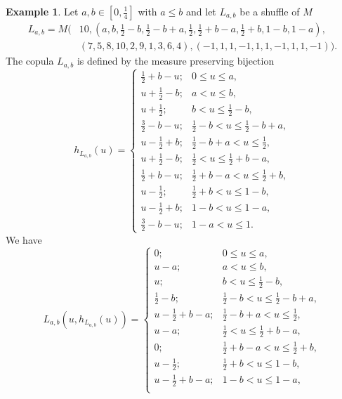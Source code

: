 \documentclass[12pt,a4paper]{amsart}
\theoremstyle{definition}
\newtheorem{example}[theorem]{Example}
\begin{document}
\begin{example}\label{ex:F5}
Let $a, b \in [0, \tfrac14]$ with $a \le b$ and let $L_{a,b}$ be a shuffle of $M$
\begin{align*}
    L_{a,b} = M\big(&10, (a, b, \tfrac12 - b, \tfrac12 - b + a, \tfrac12, \tfrac12 + b - a, \tfrac12 + b, 1-b, 1-a), \\
    &(7,5,8,10,2,9,1,3,6,4), (-1, 1, 1, -1, 1, 1, -1, 1, 1, -1)\big).
\end{align*}
The copula $L_{a,b}$ is defined by the measure preserving bijection 
$$ h_{L_{a,b}}(u) =  \begin{cases}
            \tfrac12 + b - u; &  0 \le u \le a, \\
            u + \tfrac12 - b; &  a < u \le b, \\
            u + \tfrac12; &  b < u \le \tfrac12 - b, \\
            \tfrac32 - b - u; &  \tfrac12 - b < u \le \tfrac12 - b + a, \\
            u - \tfrac12 + b; &  \tfrac12 - b + a < u \le \tfrac12, \\
            u + \tfrac12 - b; &  \tfrac12 < u \le \tfrac12 + b - a, \\
            \tfrac12 + b - u; &  \tfrac12 + b - a < u \le \tfrac12 + b, \\
            u - \tfrac12; &  \tfrac12 + b < u \le 1-b, \\
            u - \tfrac12 + b; &  1-b < u \le 1-a, \\
            \tfrac32 - b - u; &  1-a < u \le 1.
            \end{cases}
$$
We have 
$$ L_{a,b}(u,h_{L_{a,b}}(u)) =  \begin{cases}
            0; &  0 \le u \le a, \\
            u - a; &  a < u \le b, \\
            u; &  b < u \le \tfrac12 - b, \\
            \tfrac12 - b; &  \tfrac12 - b < u \le \tfrac12 - b + a, \\
            u - \tfrac12 + b - a; &  \tfrac12 - b + a < u \le \tfrac12, \\
            u - a; &  \tfrac12 < u \le \tfrac12 + b - a, \\
            0; &  \tfrac12 + b - a < u \le \tfrac12 + b, \\
            u - \tfrac12; &  \tfrac12 + b < u \le 1-b, \\
            u - \tfrac12 + b - a; &  1-b < u \le 1-a, \\

\end{cases}$$
\end{example}
\end{document}
